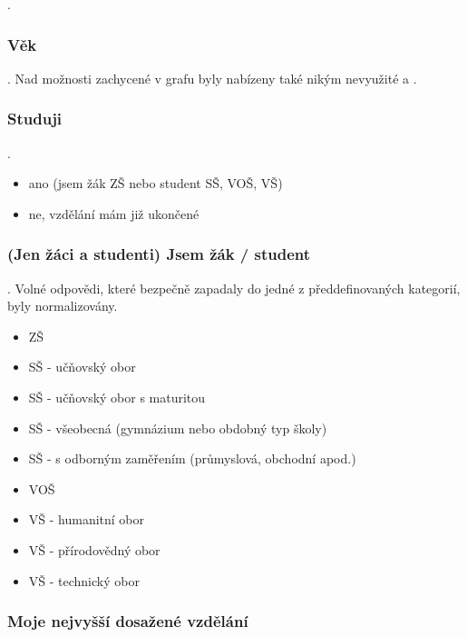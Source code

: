 \qtype \pickOne.


\subsubsection{Věk}\label{sec:vek}

\qtype \pickOne.
Nad možnosti zachycené v grafu byly nabízeny také nikým nevyužité
 a .


\subsubsection{Studuji}

\qtype \pickOne.

\begin{itemize}
\item ano (jsem žák ZŠ nebo student SŠ, VOŠ, VŠ)
\item ne, vzdělání mám již ukončené
\end{itemize}


\subsubsection{(Jen žáci a studenti) Jsem žák / student}

\qtype \pickOne \withOther.
Volné odpovědi, které bezpečně zapadaly do jedné z předdefinovaných
kategorií, byly normalizovány.

\begin{itemize}
\item ZŠ
\item SŠ - učňovský obor
\item SŠ - učňovský obor s maturitou
\item SŠ - všeobecná (gymnázium nebo obdobný typ školy)
\item SŠ - s odborným zaměřením (průmyslová, obchodní apod.)
\item VOŠ
\item VŠ - humanitní obor
\item VŠ - přírodovědný obor
\item VŠ - technický obor
\end{itemize}


\subsubsection{Moje nejvyšší dosažené vzdělání}

